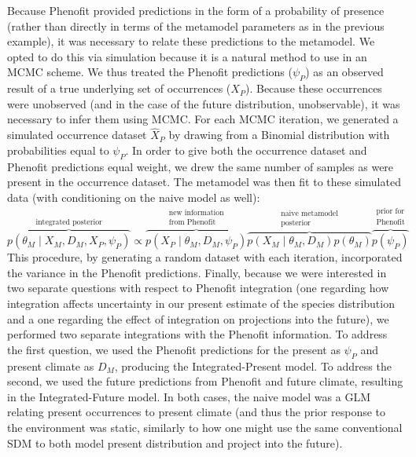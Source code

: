 \documentclass[11pt]{article}
\begin{document}
Because Phenofit provided predictions in the form of a probability of presence (rather than directly in terms of the metamodel parameters as in the previous example), it was necessary to relate these predictions to the metamodel.
We opted to do this via simulation because it is a natural method to use in an MCMC scheme.
We thus treated the Phenofit predictions (\(\psi_P\)) as an observed result of a true underlying set of occurrences (\(X_P\)).
Because these occurrences were unobserved (and in the case of the future distribution, unobservable), it was necessary to infer them using MCMC.
For each MCMC iteration, we generated a simulated occurrence dataset \(\hat{X}_P\) by drawing from a Binomial distribution with probabilities equal to \(\psi_P\).
In order to give both the occurrence dataset and Phenofit predictions equal weight, we drew the same number of samples as were present in the occurrence dataset.
The metamodel was then fit to these simulated data (with conditioning on the naive model as well):
\begin{equation} 
\overbrace{p(\theta_M \mid X_M, D_M, X_P, \psi_P)}^\text{integrated posterior}
\propto
\overbrace{p\left (X_P \mid \theta_M,D_M,\psi_P \right )}^{\substack{\text{new information} \\ \text{from Phenofit}}}
\overbrace{p \left(X_M \mid \theta_M, D_M \right) p \left(\theta_M \right)}^{\substack{\text{naive metamodel} \\ \text{posterior}}}
\overbrace{p \left(\psi_P \right)}^{\substack{\text{prior for} \\ \text{Phenofit}}}	
\end{equation}
This procedure, by generating a random dataset with each iteration, incorporated the variance in the Phenofit predictions.
Finally, because we were interested in two separate questions with respect to Phenofit integration (one regarding how integration affects uncertainty in our present estimate of the species distribution and a one regarding the effect of integration on projections into the future), we performed two separate integrations with the Phenofit information.
To address the first question, we used the Phenofit predictions for the present as \(\psi_P\) and present climate as \(D_M\), producing the Integrated-Present model.
To address the second, we used the future predictions from Phenofit and future climate, resulting in the Integrated-Future model.
In both cases, the naive model was a GLM relating present occurrences to present climate (and thus the prior response to the environment was static, similarly to how one might use the same conventional SDM to both model present distribution and project into the future).
\end{document}
